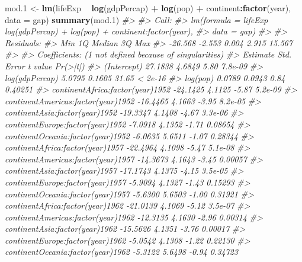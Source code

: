 \documentclass[]{book}
\newenvironment{Shaded}{\begin{snugshade}}{\end{snugshade}}
\newcommand{\CommentTok}[1]{\textcolor[rgb]{0.56,0.35,0.01}{\textit{#1}}}
\newcommand{\DataTypeTok}[1]{\textcolor[rgb]{0.13,0.29,0.53}{#1}}
\newcommand{\FloatTok}[1]{\textcolor[rgb]{0.00,0.00,0.81}{#1}}
\newcommand{\KeywordTok}[1]{\textcolor[rgb]{0.13,0.29,0.53}{\textbf{#1}}}
\newcommand{\NormalTok}[1]{#1}
\newcommand{\OperatorTok}[1]{\textcolor[rgb]{0.81,0.36,0.00}{\textbf{#1}}}
\newcommand{\StringTok}[1]{\textcolor[rgb]{0.31,0.60,0.02}{#1}}
\begin{document}
\begin{Shaded}
\begin{Highlighting}[]
\NormalTok{mod}\FloatTok{.1}\NormalTok{ <-}\StringTok{ }\KeywordTok{lm}\NormalTok{(lifeExp }\OperatorTok{~}\StringTok{ }\KeywordTok{log}\NormalTok{(gdpPercap) }\OperatorTok{+}\StringTok{ }\KeywordTok{log}\NormalTok{(pop) }\OperatorTok{+}\StringTok{ }\NormalTok{continent}\OperatorTok{:}\KeywordTok{factor}\NormalTok{(year), }\DataTypeTok{data =}\NormalTok{ gap)}
\KeywordTok{summary}\NormalTok{(mod}\FloatTok{.1}\NormalTok{)}
\CommentTok{#> }
\CommentTok{#> Call:}
\CommentTok{#> lm(formula = lifeExp ~ log(gdpPercap) + log(pop) + continent:factor(year), }
\CommentTok{#>     data = gap)}
\CommentTok{#> }
\CommentTok{#> Residuals:}
\CommentTok{#>     Min      1Q  Median      3Q     Max }
\CommentTok{#> -26.568  -2.553   0.004   2.915  15.567 }
\CommentTok{#> }
\CommentTok{#> Coefficients: (1 not defined because of singularities)}
\CommentTok{#>                                    Estimate Std. Error t value Pr(>|t|)}
\CommentTok{#> (Intercept)                         27.1838     4.6849    5.80  7.8e-09}
\CommentTok{#> log(gdpPercap)                       5.0795     0.1605   31.65  < 2e-16}
\CommentTok{#> log(pop)                             0.0789     0.0943    0.84  0.40251}
\CommentTok{#> continentAfrica:factor(year)1952   -24.1425     4.1125   -5.87  5.2e-09}
\CommentTok{#> continentAmericas:factor(year)1952 -16.4465     4.1663   -3.95  8.2e-05}
\CommentTok{#> continentAsia:factor(year)1952     -19.3347     4.1408   -4.67  3.3e-06}
\CommentTok{#> continentEurope:factor(year)1952    -7.0918     4.1352   -1.71  0.08654}
\CommentTok{#> continentOceania:factor(year)1952   -6.0635     5.6511   -1.07  0.28344}
\CommentTok{#> continentAfrica:factor(year)1957   -22.4964     4.1098   -5.47  5.1e-08}
\CommentTok{#> continentAmericas:factor(year)1957 -14.3673     4.1643   -3.45  0.00057}
\CommentTok{#> continentAsia:factor(year)1957     -17.1743     4.1375   -4.15  3.5e-05}
\CommentTok{#> continentEurope:factor(year)1957    -5.9094     4.1327   -1.43  0.15293}
\CommentTok{#> continentOceania:factor(year)1957   -5.6300     5.6503   -1.00  0.31921}
\CommentTok{#> continentAfrica:factor(year)1962   -21.0139     4.1069   -5.12  3.5e-07}
\CommentTok{#> continentAmericas:factor(year)1962 -12.3135     4.1630   -2.96  0.00314}
\CommentTok{#> continentAsia:factor(year)1962     -15.5626     4.1351   -3.76  0.00017}
\CommentTok{#> continentEurope:factor(year)1962    -5.0542     4.1308   -1.22  0.22130}
\CommentTok{#> continentOceania:factor(year)1962   -5.3122     5.6498   -0.94  0.34723}

\end{Highlighting}
\end{Shaded}
\end{document}
